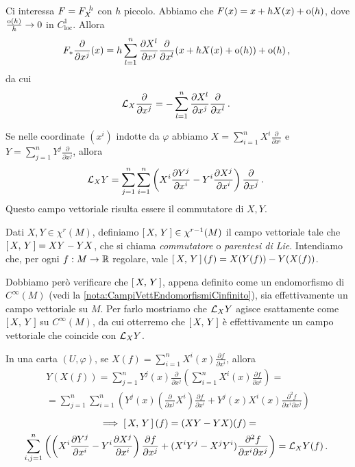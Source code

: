 Ci interessa $F=F_{X}^{\ h}$ con $h$ piccolo. Abbiamo che $F(x)=x+hX(x)+\mathrm{o}(h)$, dove $\frac{\mathrm{o}(h)}{h}\to 0$ in $C^1_{\text{loc}}$.
Allora
\begin{equation*}F_*\frac\partial{\partial x^j}(x)=h\sum_{l=1}^n \frac{\partial X^l}{\partial x^j}\frac\partial{\partial x^l}(x+hX(x)+\mathrm{o}(h))+\mathrm{o}(h)\, \text{, }\end{equation*}
da cui
\begin{equation*}
	\mathcal L_X\frac\partial{\partial x^j}=-\sum_{l=1}^n \frac{\partial X^l}{\partial x^j}\frac\partial{\partial x^l}\, \text{. }
\end{equation*}

Se nelle coordinate $(x^i)$ indotte da $\varphi$ abbiamo $X=\sum_{i=1}^n X^i\frac\partial{\partial x^i}$ e $Y=\sum_{j=1}^n Y^j\frac\partial{\partial x^j}$, allora
\begin{equation*}
	\mathcal L_XY=\sum_{j=1}^n\sum_{i=1}^n \left(X^i\frac{\partial Y^j}{\partial x^i}-Y^i\frac{\partial X^j}{\partial x^i}\right)\frac\partial{\partial x^j} \, \text{. }
\end{equation*}
Questo campo vettoriale risulta essere il commutatore di $X,Y$.

\begin{definition}  
Dati $X,Y\in\chi^r(M)$, definiamo $\left[\,X,\,Y\,\right]\in\chi^{r-1}(M)$ il campo vettoriale tale che $\left[\,X,\,Y\,\right]=XY-YX$, che si chiama \emph{commutatore} o \emph{parentesi di Lie}.
Intendiamo che, per ogni $f:M\to\mathbb R$ regolare, vale $\left[\,X,\,Y\,\right](f)=X(Y(f))-Y(X(f))$.
\end{definition}

Dobbiamo però verificare che $\left[\,X,\,Y\,\right]$, appena definito come un endomorfismo di $C^\infty(M)$ (vedi la \cref{nota:CampiVettEndomorfismiCinfinito}), sia effettivamente un campo vettoriale su $M$.  Per farlo mostriamo che $\mathcal L_XY$ agisce esattamente come $\left[\,X,\,Y\,\right]$ su $C^\infty(M)$, da cui otterremo che $\left[\,X,\,Y\,\right]$ è effettivamente un campo vettoriale che coincide con $\mathcal L_XY$.

In una carta $(U,\varphi)$, se $X(f)=\sum_{i=1}^n X^i(x)\frac{\partial f}{\partial x^i}$, allora
\begin{multline*}
	Y(X(f))=\sum_{j=1}^nY^j(x)\frac\partial{\partial x^j}\left( \sum_{i=1}^n X^i(x)\frac{\partial f}{\partial x^i} \right)=\\
	= \sum_{j=1}^n \sum_{i=1}^n \left( Y^j(x) \left(\frac{\partial}{\partial x^j}X^i\right)\frac{\partial f}{\partial x^i} +Y^j(x)X^i(x)\frac{\partial^2 f}{\partial x^i\partial x^j} \right)
\end{multline*}
\begin{multline*}
	\implies \left[\,X,\,Y\,\right](f) = (XY-YX)(f)=\\
	\sum_{i,j=1}^n\left( \left(X^i\frac{\partial Y^j}{\partial x^i}-Y^i\frac{\partial X^j}{\partial x^i}\right)\frac{\partial f}{\partial x^j} +(X^iY^j-X^jY^i)\frac{\partial^2 f}{\partial x^i\partial x^j}  \right)=\mathcal L_XY(f) \, \text{. }
\end{multline*}

